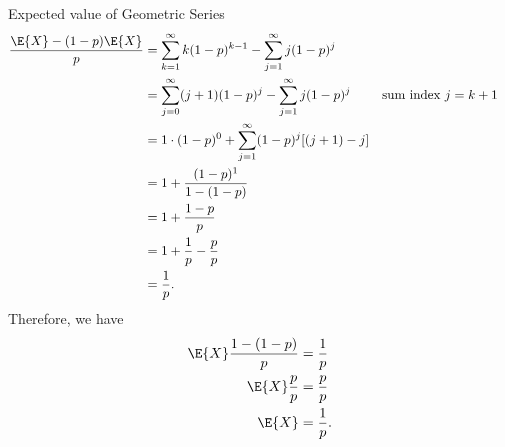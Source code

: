 \begin{Remark}{Expected value of Geometric Series}{}
    \begin{align*}
        \frac{\E{X}-(1-p)\E{X}}{p}
         & =\sum_{k=1}^{\infty}k(1-p)^{k-1}-\sum_{j=1}^{\infty}j(1-p)^j                             \\
         & =\sum_{j=0}^{\infty}(j+1)(1-p)^j-\sum_{j=1}^{\infty}j(1-p)^j &  & \text{sum index }j=k+1 \\
         & =1\cdot(1-p)^0+\sum_{j=1}^{\infty}(1-p)^j[(j+1)-j]                                       \\
         & =1+\frac{(1-p)^1}{1-(1-p)}                                                               \\
         & =1+\frac{1-p}{p}                                                                         \\
         & =1+\frac{1}{p}-\frac{p}{p}                                                               \\
         & =\frac{1}{p}.
    \end{align*}
    Therefore, we have
    \begin{align*}
        \E{X}\frac{1-(1-p)}{p} & =\frac{1}{p}  \\
        \E{X}\frac{p}{p}       & =\frac{p}{p}  \\
        \E{X}                  & =\frac{1}{p}.
    \end{align*}
\end{Remark}
